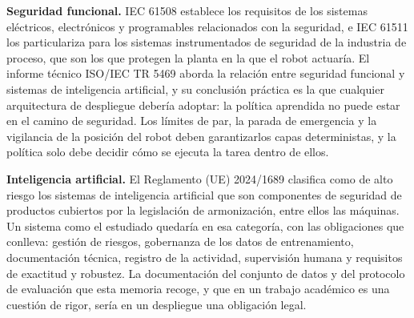 \textbf{Seguridad funcional.} IEC 61508 establece los requisitos de los sistemas eléctricos,
electrónicos y programables relacionados con la seguridad, e IEC 61511 los particulariza para los
sistemas instrumentados de seguridad de la industria de proceso, que son los que protegen la planta
en la que el robot actuaría. El informe técnico ISO/IEC TR 5469 aborda la relación entre seguridad
funcional y sistemas de inteligencia artificial, y su conclusión práctica es la que cualquier
arquitectura de despliegue debería adoptar: la política aprendida no puede estar en el camino de
seguridad. Los límites de par, la parada de emergencia y la vigilancia de la posición del robot
deben garantizarlos capas deterministas, y la política solo debe decidir cómo se ejecuta la tarea
dentro de ellos.

\textbf{Inteligencia artificial.} El Reglamento (UE) 2024/1689 clasifica como de alto riesgo los
sistemas de inteligencia artificial que son componentes de seguridad de productos cubiertos por la
legislación de armonización, entre ellos las máquinas. Un sistema como el estudiado quedaría en esa
categoría, con las obligaciones que conlleva: gestión de riesgos, gobernanza de los datos de
entrenamiento, documentación técnica, registro de la actividad, supervisión humana y requisitos de
exactitud y robustez. La documentación del conjunto de datos y del protocolo de evaluación que esta
memoria recoge, y que en un trabajo académico es una cuestión de rigor, sería en un despliegue una
obligación legal.

